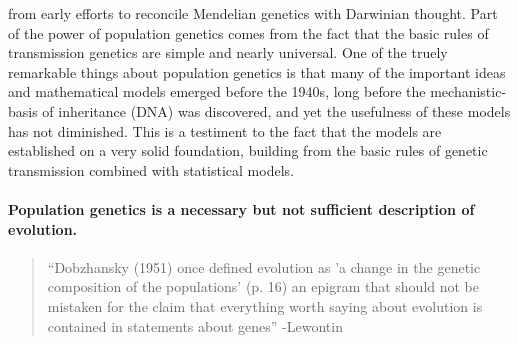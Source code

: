  from early efforts to
reconcile Mendelian genetics with Darwinian thought.
Part of the power of
population genetics comes from the fact that the basic rules of
transmission genetics are simple and nearly universal.  One of the truely remarkable things about population genetics is that
many of the important ideas and mathematical models emerged before the
1940s, long before the
mechanistic-basis of inheritance (DNA) was discovered, and yet the
usefulness of these models has not diminished. This is a testiment to
the fact that the models are established on a very solid foundation,
building from the basic rules of genetic transmission combined with
statistical models.   

\paragraph{Population genetics is a necessary but not sufficient description of evolution.}
\begin{quote}
``Dobzhansky (1951) once defined evolution as 'a change in the genetic
composition of the populations' (p. 16) an epigram that should not be
mistaken for the claim that everything worth saying about evolution is
contained in statements about genes'' -Lewontin \cite{lewontin01} 
\end{quote}





\newpage